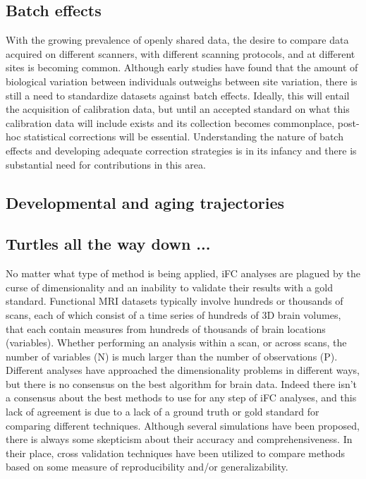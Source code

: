 \subsection{Batch effects}

With the growing prevalence of openly shared data, the desire to compare data acquired on different scanners, with different scanning protocols, and at different sites is becoming common. Although early studies have found that the amount of biological variation between individuals outweighs between site variation\cite{biswal}, there is still a need to standardize datasets against batch effects\cite{YanStand}. Ideally, this will entail the acquisition of calibration data, but until an accepted standard on what this calibration data will include exists and its collection becomes commonplace, post-hoc statistical corrections will be essential. Understanding the nature of batch effects and developing adequate correction strategies is in its infancy and there is substantial need for contributions in this area.  

\subsection{Developmental and aging trajectories}


\subsection{Turtles all the way down ...}

No matter what type of method is being applied, iFC analyses are plagued by the curse of dimensionality and an inability to validate their results with a gold standard. Functional MRI datasets typically involve hundreds or thousands of scans, each of which consist of a time series of hundreds of 3D brain volumes, that each contain measures from hundreds of thousands of brain locations (variables). Whether performing an analysis within a scan, or across scans, the number of variables (N) is much larger than the number of observations (P). Different analyses have approached the dimensionality problems in different ways, but there is no consensus on the best algorithm for brain data. Indeed there isn't a consensus about the best methods to use for any step of iFC analyses, and this lack of agreement is due to a lack of a ground truth or gold standard for comparing different techniques. Although several simulations have been proposed, there is always some skepticism about their accuracy and comprehensiveness. In their place, cross validation techniques have been utilized to compare methods based on some measure of reproducibility and/or generalizability.

